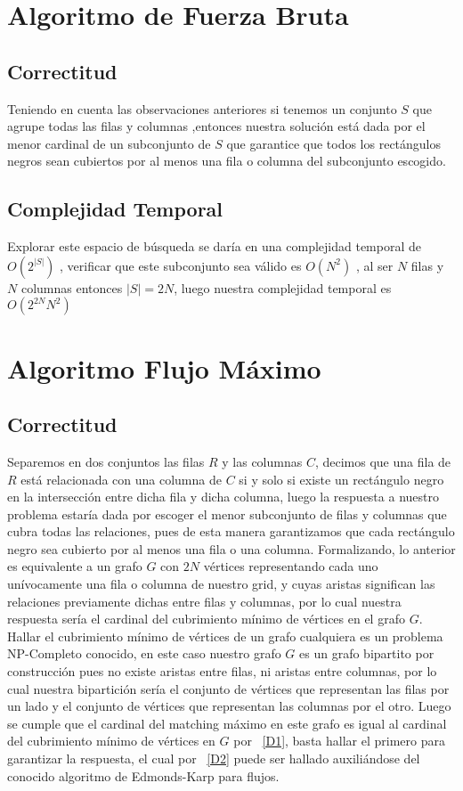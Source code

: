 \documentclass[12pt,a4paper]{report}
\begin{document}
\section{Algoritmo de Fuerza Bruta}
\subsection{Correctitud}
Teniendo en cuenta las observaciones anteriores si tenemos un conjunto $S$ que agrupe todas las filas y columnas ,entonces nuestra solución está dada por el menor cardinal  de un subconjunto de $S$ que garantice que todos los rectángulos negros sean cubiertos por al menos una fila o columna del subconjunto escogido.
\subsection{Complejidad Temporal}
Explorar este espacio de búsqueda se daría en una complejidad temporal de $O(2 ^{|S|})$ , verificar que este subconjunto sea válido es $O(N^2)$ , al ser $N$ filas y $N$ columnas entonces $|S| = 2N $, luego nuestra complejidad temporal es $O(2^{2N}N^2)$
\newpage
\section{Algoritmo Flujo Máximo}
\subsection{Correctitud}
Separemos en dos conjuntos las filas $R$ y las columnas $C$, decimos que una fila de $R$ está relacionada con una columna de $C$  si y solo si existe un rectángulo negro en la intersección entre dicha fila y dicha columna, luego la respuesta a nuestro problema estaría dada por escoger el menor subconjunto de filas y columnas que cubra todas las relaciones, pues de esta manera garantizamos que cada rectángulo negro sea cubierto por al menos una fila o una columna. Formalizando, lo anterior es equivalente a un grafo $G$ con $2N$ vértices representando cada uno unívocamente una fila o columna de nuestro grid, y cuyas aristas significan las relaciones previamente dichas entre filas y columnas, por lo cual nuestra respuesta sería el cardinal del cubrimiento mínimo de vértices en el grafo $G$.
Hallar el cubrimiento mínimo de vértices de un grafo cualquiera es un problema NP-Completo conocido, en este caso nuestro grafo $G$ es un grafo bipartito por construcción pues no existe aristas entre filas, ni aristas entre columnas, por lo cual nuestra bipartición sería el conjunto de vértices que representan las filas por un lado y el conjunto de vértices que representan las columnas por el otro. Luego se cumple que el cardinal del matching máximo en este grafo es igual al cardinal del cubrimiento mínimo de vértices en $G$ por ~\ref{D1}, basta hallar el primero para garantizar la respuesta, el cual por ~\ref{D2} puede ser hallado auxiliándose del conocido algoritmo de Edmonds-Karp para flujos.
\end{document}
